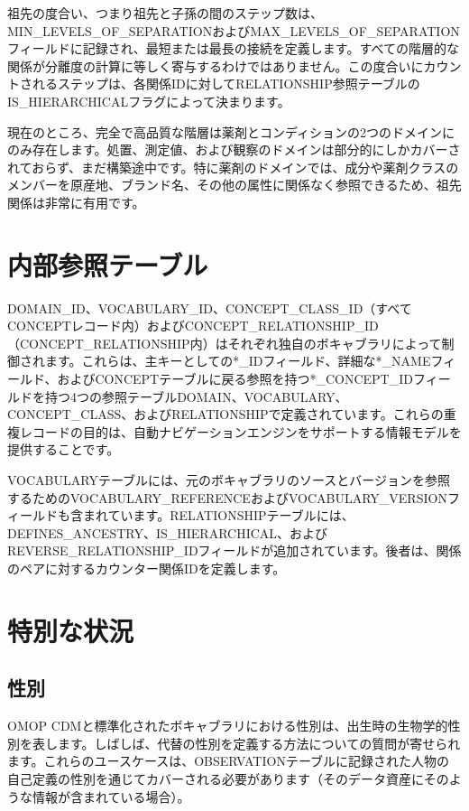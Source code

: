 \documentclass[
  11pt]{book}
\theoremstyle{definition}
\theoremstyle{definition}
\theoremstyle{definition}
\theoremstyle{definition}
\theoremstyle{remark}
\begin{document}
祖先の度合い、つまり祖先と子孫の間のステップ数は、MIN\_LEVELS\_OF\_SEPARATIONおよびMAX\_LEVELS\_OF\_SEPARATIONフィールドに記録され、最短または最長の接続を定義します。すべての階層的な関係が分離度の計算に等しく寄与するわけではありません。この度合いにカウントされるステップは、各関係IDに対してRELATIONSHIP参照テーブルのIS\_HIERARCHICALフラグによって決まります。

現在のところ、完全で高品質な階層は薬剤とコンディションの2つのドメインにのみ存在します。処置、測定値、および観察のドメインは部分的にしかカバーされておらず、まだ構築途中です。特に薬剤のドメインでは、成分や薬剤クラスのメンバーを原産地、ブランド名、その他の属性に関係なく参照できるため、祖先関係は非常に有用です。

\section{内部参照テーブル}\label{ux5185ux90e8ux53c2ux7167ux30c6ux30fcux30d6ux30eb}

DOMAIN\_ID、VOCABULARY\_ID、CONCEPT\_CLASS\_ID（すべてCONCEPTレコード内）およびCONCEPT\_RELATIONSHIP\_ID（CONCEPT\_RELATIONSHIP内）はそれぞれ独自のボキャブラリによって制御されます。これらは、主キーとしての*\_IDフィールド、詳細な*\_NAMEフィールド、およびCONCEPTテーブルに戻る参照を持つ*\_CONCEPT\_IDフィールドを持つ4つの参照テーブルDOMAIN、VOCABULARY、CONCEPT\_CLASS、およびRELATIONSHIPで定義されています。これらの重複レコードの目的は、自動ナビゲーションエンジンをサポートする情報モデルを提供することです。

VOCABULARYテーブルには、元のボキャブラリのソースとバージョンを参照するためのVOCABULARY\_REFERENCEおよびVOCABULARY\_VERSIONフィールドも含まれています。RELATIONSHIPテーブルには、DEFINES\_ANCESTRY、IS\_HIERARCHICAL、およびREVERSE\_RELATIONSHIP\_IDフィールドが追加されています。後者は、関係のペアに対するカウンター関係IDを定義します。

\section{特別な状況}\label{specialSituations}

\subsection{性別}\label{ux6027ux5225}

OMOP CDMと標準化されたボキャブラリにおける性別は、出生時の生物学的性別を表します。しばしば、代替の性別を定義する方法についての質問が寄せられます。これらのユースケースは、OBSERVATIONテーブルに記録された人物の自己定義の性別を通じてカバーされる必要があります（そのデータ資産にそのような情報が含まれている場合）。
\end{document}

